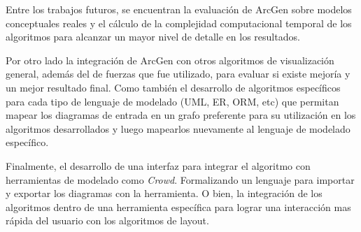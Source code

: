 Entre los trabajos futuros,  se encuentran la evaluación de  {\sc ArcGen} sobre modelos conceptuales reales y el cálculo de la complejidad computacional temporal de los algoritmos para alcanzar un mayor nivel de detalle en los resultados.

Por otro lado la integración de {\sc ArcGen} con otros algoritmos de visualización general, además del de fuerzas que fue utilizado, para evaluar si existe mejoría y un mejor resultado final. Como también el desarrollo de algoritmos específicos para cada tipo de lenguaje de modelado (UML, ER, ORM, etc) que permitan mapear los diagramas de entrada en un grafo preferente para su utilización en los algoritmos desarrollados y luego mapearlos nuevamente al lenguaje de modelado específico.

Finalmente, el desarrollo de una interfaz para integrar el algoritmo con herramientas de modelado como \emph{Crowd}. Formalizando un lenguaje para importar y exportar los diagramas con la herramienta. O bien, la integración de los algoritmos dentro de una herramienta específica para lograr una interacción mas rápida del usuario con los algoritmos de layout.